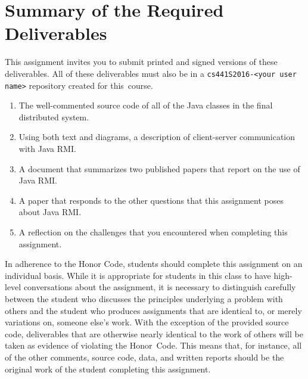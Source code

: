 \section*{Summary of the Required Deliverables}

This assignment invites you to submit printed and signed versions of these deliverables. All of these deliverables must
also be in a {\tt cs441S2016-<your user name>} repository created for \mbox{this course}.

\vspace*{-.1in}

\begin{enumerate}
  \itemsep 0em

  \item The well-commented source code of all of the Java classes in the final distributed system.

  \item Using both text and diagrams, a description of client-server communication with Java RMI.

  \item A document that summarizes two published papers that report on the use of Java RMI.

  \item A paper that responds to the other questions that this assignment poses about Java RMI.

  \item A reflection on the challenges that you encountered when completing this assignment.

\end{enumerate}

\vspace*{-.1in}


In adherence to the Honor Code, students should complete this assignment on an individual basis. While it is appropriate
for students in this class to have high-level conversations about the assignment, it is necessary to distinguish
carefully between the student who discusses the principles underlying a problem with others and the student who produces
assignments that are identical to, or merely variations on, someone else's work.  With the exception of the provided
source code, deliverables that are otherwise nearly identical to the work of others will be taken as evidence of
violating the \mbox{Honor Code}. This means that, for instance, all of the other comments, source code, data, and
written reports should be the original work of the student completing this assignment.



